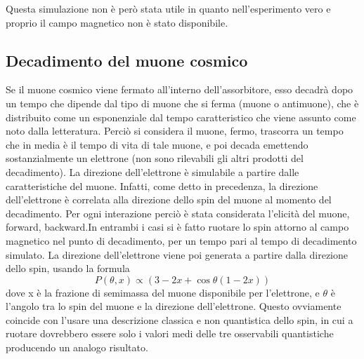 Questa simulazione non \`e per\`o stata utile in quanto nell'esperimento vero e proprio il campo magnetico non \`e stato disponibile.


\subsection{Decadimento del muone cosmico}
Se il muone cosmico viene fermato all'interno dell'assorbitore, esso decadrà dopo un tempo che dipende dal tipo di muone che si ferma (muone o antimuone), che è distribuito
come un esponenziale dal tempo caratteristico che viene assunto come noto dalla letteratura. Perciò si considera il muone, fermo, trascorra un tempo che in media è il tempo
di vita di tale muone, e poi decada emettendo sostanzialmente un elettrone (non sono rilevabili gli altri prodotti del decadimento). La direzione dell'elettrone \`e simulabile a partire dalle caratteristiche del muone. Infatti, come detto in precedenza, la direzione dell'elettrone \`e correlata alla direzione dello spin del muone al momento del decadimento. Per ogni interazione perci\`o \`e stata considerata l'elicit\`a del muone, forward, backward.In entrambi i casi si \`e fatto ruotare lo spin attorno al campo magnetico nel punto di decadimento, per un tempo pari al tempo di decadimento simulato. La direzione dell'elettrone viene poi generata a partire dalla direzione dello spin, usando la formula 
\begin{equation}
	P(\theta, x) \propto \left(3 - 2 x + \cos{\theta}\left(1 - 2 x\right)\right)
\end{equation}
dove x \`e la frazione di semimassa del muone disponibile per l'elettrone, e $\theta$ \`e l'angolo tra lo spin del muone e la direzione dell'elettrone. Questo ovviamente coincide con l'usare una descrizione classica e non quantistica dello spin, in cui a ruotare dovrebbero essere solo i valori medi delle tre osservabili quantistiche producendo un analogo risultato.

